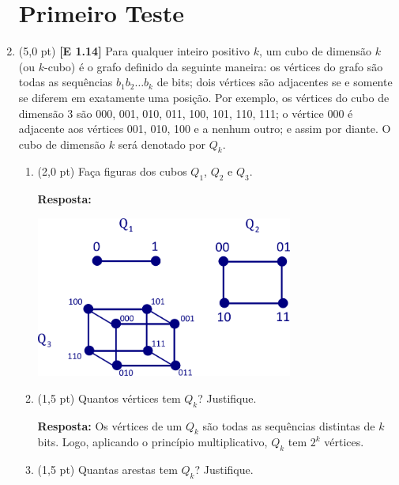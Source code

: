 \documentclass[12pt,a4paper,oneside]{article}
\begin{document}
\begin{enumerate}
	
	\section*{Primeiro Teste}
	
	\item (5,0 pt) {\bf [E 1.14]} Para qualquer inteiro positivo $k$, um cubo de dimensão $k$ (ou $k$-cubo) é o grafo definido da seguinte maneira: os vértices do grafo são todas as sequências $b_1 b_2 \ldots b_k$ de bits; dois vértices são adjacentes se e somente se
	diferem em exatamente uma posição. Por exemplo, os vértices do cubo de dimensão 3 são 000, 001, 010, 011, 100, 101, 110, 111; o vértice 000 é adjacente aos vértices 001, 010, 100 e a nenhum outro; e assim por diante. O cubo de dimensão $k$ será denotado por $Q_k$.
	\begin{enumerate}
		\item (2,0 pt) Faça figuras dos cubos $Q_1$, $Q_2$ e $Q_3$.
		
		\vspace*{0.1cm} 
		
		{\color{blue} {\bf Resposta:} 
			\begin{flushleft}
				\includegraphics[width=0.7\textwidth]{images/cubos}
			\end{flushleft}
		}
		\item (1,5 pt) Quantos vértices tem $Q_k$? Justifique.
		
		\vspace*{0.1cm} 
		
		{\color{blue} {\bf Resposta:}
			Os vértices de um $Q_k$ são todas as sequências distintas de $k$ bits. Logo, aplicando o princípio multiplicativo, $Q_k$ tem $2^k$ vértices.
		} 
		\item (1,5 pt) Quantas arestas tem $Q_k$? Justifique.
		
		\vspace*{0.1cm} 
		

\end{enumerate}
\end{enumerate}
\end{document}
